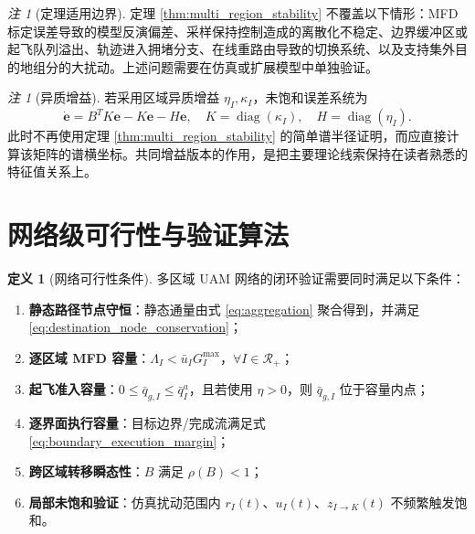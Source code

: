\documentclass[a4paper,12pt]{article}
\theoremstyle{plain}
\theoremstyle{definition}
\newtheorem{definition}[theorem]{定义}
\theoremstyle{remark}
\newtheorem{remark}[theorem]{注}
\begin{document}
\begin{remark}[定理适用边界]\label{rem:stability_scope_v20}
定理 \ref{thm:multi_region_stability} 不覆盖以下情形：MFD 标定误差导致的模型反演偏差、采样保持控制造成的离散化不稳定、边界缓冲区或起飞队列溢出、轨迹进入拥堵分支、在线重路由导致的切换系统、以及支持集外目的地组分的大扰动。上述问题需要在仿真或扩展模型中单独验证。
\end{remark}

\begin{remark}[异质增益]
若采用区域异质增益 $\eta_I,\kappa_I$，未饱和误差系统为
\[
    \dot{\bm e}=B^T K\bm e-K\bm e-H\bm e,
    \quad K=\operatorname{diag}(\kappa_I),\quad H=\operatorname{diag}(\eta_I).
\]
此时不再使用定理 \ref{thm:multi_region_stability} 的简单谱半径证明，而应直接计算该矩阵的谱横坐标。共同增益版本的作用，是把主要理论线索保持在读者熟悉的特征值关系上。
\end{remark}

\section{网络级可行性与验证算法}

\begin{definition}[网络可行性条件]\label{def:network_feasibility}
多区域 UAM 网络的闭环验证需要同时满足以下条件：
\begin{enumerate}
    \item \textbf{静态路径节点守恒}：静态通量由式 \eqref{eq:aggregation} 聚合得到，并满足 \eqref{eq:destination_node_conservation}；
    \item \textbf{逐区域 MFD 容量}：$\Lambda_I<\bar u_I G_I^{\max}$，$\forall I\in\mathcal R_+$；
    \item \textbf{起飞准入容量}：$0\le \bar q_{g,I}\le \bar q_I^a$，且若使用 $\eta>0$，则 $\bar q_{g,I}$ 位于容量内点；
    \item \textbf{逐界面执行容量}：目标边界/完成流满足式 \eqref{eq:boundary_execution_margin}；
    \item \textbf{跨区域转移瞬态性}：$B$ 满足 $\rho(B)<1$；
    \item \textbf{局部未饱和验证}：仿真扰动范围内 $r_I(t)$、$u_I(t)$、$z_{I\to K}(t)$ 不频繁触发饱和。
\end{enumerate}
\end{definition}
\end{document}
